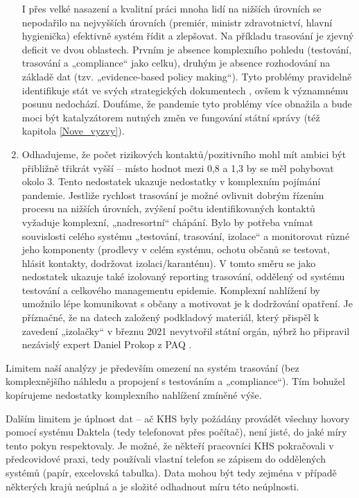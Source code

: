 \begin{enumerate}
I přes velké nasazení a kvalitní práci mnoha lidí na nižších úrovních se nepodařilo na nejvyšších úrovních (premiér, ministr zdravotnictví, hlavní hygienička) efektivně systém řídit a zlepšovat. Na příkladu trasování je zjevný deficit ve dvou oblastech. Prvním je absence komplexního pohledu (testování, trasování a „compliance“ jako celku), druhým je absence rozhodování na základě dat (tzv. „evidence-based policy making“). Tyto problémy pravidelně identifikuje stát ve svých strategických dokumentech \cite{tr_MVCR, tr_MZP}, ovšem k významnému posunu nedochází. Doufáme, že pandemie tyto problémy více obnažila a bude moci být katalyzátorem nutných změn ve fungování státní správy (též kapitola \ref{Nove_vyzvy}).
\item Odhadujeme, že počet rizikových kontaktů/pozitivního mohl mít ambici být přibližně třikrát vyšší -- místo hodnot mezi 0,8 a 1,3 by se měl pohybovat okolo 3. Tento nedostatek ukazuje nedostatky v komplexním pojímání pandemie. Jestliže rychlost trasování je možné ovlivnit dobrým řízením procesu na nižších úrovních, zvýšení počtu identifikovaných kontaktů vyžaduje komplexní, „nadresortní“ chápání. Bylo by potřeba vnímat souvislosti celého systému „testování, trasování, izolace“ a monitorovat různé jeho komponenty (prodlevy v celém systému, ochotu občanů se
testovat, hlásit kontakty, dodržovat izolaci/karanténu). V tomto směru se jako nedostatek ukazuje také izolovaný reporting trasování, oddělený od systému testování a celkového managementu epidemie. Komplexní nahlížení by umožnilo
lépe komunikovat s občany a motivovat je k dodržování opatření. Je příznačné, že na datech založený podkladový materiál, který přispěl k zavedení „izolačky“ \cite{tr_MPSV} v březnu 2021 nevytvořil státní orgán, nýbrž ho připravil nezávislý expert Daniel Prokop z PAQ \cite{tr_PAQ02}.
\end{enumerate}

Limitem naší analýzy je především omezení na systém trasování (bez komplexnějšího náhledu a propojení s testováním a „compliance“). Tím bohužel kopírujeme nedostatky komplexního nahlížení zmíněné výše.

Dalším limitem je úplnost dat -- ač KHS byly požádány provádět všechny hovory pomocí systému Daktela (tedy telefonovat přes počítač), není jisté, do jaké míry tento pokyn respektovaly. Je možné, že někteří pracovníci KHS pokračovali v předcovidové praxi, tedy používali vlastní telefon se zápisem do oddělených systémů (papír, excelovská tabulka). Data mohou být tedy zejména v případě některých krajů neúplná a je složité odhadnout míru této neúplnosti.

